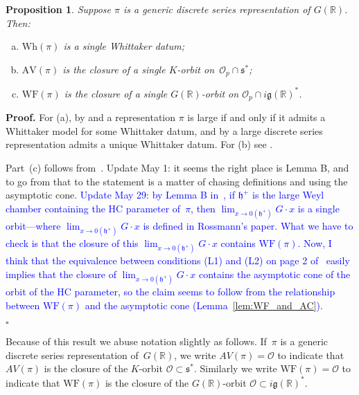 \documentclass[10pt,leqno]{article}
\newtheorem{proposition}[equation]{Proposition}
\newcommand{\qed}{\hfill $\square$ \medskip}
\newenvironment{proof}[1][Proof]{\noindent\textbf{#1.} }{\qed}
\renewcommand{\O}{\mathcal O}
\newcommand{\R}{\mathbb R}
\newcommand{\g}{\mathfrak g}
\newcommand{\s}{\mathfrak s}
\newcommand{\AV}{\mathrm{AV}}
\newcommand{\Wh}{\mathrm{Wh}}
\newcommand{\WF}{\mathrm{WF}}
\begin{document}
\begin{proposition} \label{invariants_ds}
  Suppose $\pi$ is a generic discrete series representation of $G(\R)$. Then:
\begin{enumerate}[(a)]
\item $\Wh(\pi)$ is a single Whittaker datum;
\item $\AV(\pi)$ is the closure of a single $K$-orbit on~$\mathcal{O}_p \cap \s^*$;
\item  $\WF(\pi)$ is the closure of a single $G(\R)$-orbit on $\mathcal{O}_p \cap  i \g(\R)^*$.
\end{enumerate}
\end{proposition}

\begin{proof} For (a), by \cite{vogan-gelfand-kirillov} and \cite{kostant_whittaker}
a representation $\pi$ is large if and only if it admits a Whittaker model for some Whittaker datum,
and by \cite[Lemma 14.14]{abv} a  large discrete series representation admits a unique Whittaker datum.
For (b) see \cite[Proposition A.9]{AV1}.

Part~(c) follows from~\cite{rossmann_limit_orbits}.  Update May 1: it seems the right place is Lemma B, and to go from that to the statement is a matter of chasing definitions and using the asymptotic cone. \textcolor{blue}{Update May 29: by Lemma B in~\cite{rossmann_limit_orbits}, if $\mathfrak{h}^+$ is the large Weyl chamber containing the HC parameter of~$\pi$, then $\lim_{x \to 0(\mathfrak{h}^+)} G\cdot x$ is a single orbit---where $\lim_{x \to 0(\mathfrak{h}^+)} G\cdot x$ is defined in Rossmann's paper. What we have to check is that the closure of this $\lim_{x \to 0(\mathfrak{h}^+)} G\cdot x$ contains $\WF(\pi)$. Now, I think that  the equivalence between conditions  (L1) and (L2) on page 2 of~\cite{rossmann_limit_orbits} easily implies that the closure of $\lim_{x \to 0(\mathfrak{h}^+)} G\cdot x$ contains the asymptotic cone of the orbit of the HC parameter, so the claim seems to follow from the relationship between $\WF(\pi)$ and the asymptotic cone (Lemma~\ref{lem:WF_and_AC}).}


\end{proof}

Because of this result we abuse notation slightly as follows. If~$\pi$ is a generic discrete series representation of~$G(\R)$, we write $AV(\pi)=\O$ to indicate that $AV(\pi)$ is the closure of the $K$-orbit $\O\subset \s^*$.
Similarly we write $\WF(\pi)=\O$ to indicate that $\WF(\pi)$ is the closure of the $G(\R)$-orbit $\O\subset i\g(\R)^*$.
\end{document}
